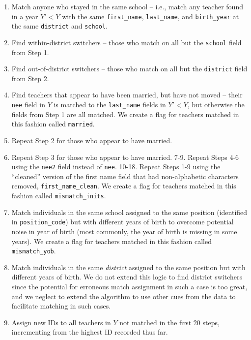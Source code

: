 \begin{appendices}
\begin{enumerate}
\def\labelenumi{\arabic{enumi}.}
\tightlist
\item
  Match anyone who stayed in the same school -- i.e., match any teacher
  found in a year \(Y'<Y\) with the same \texttt{first\_name},
  \texttt{last\_name}, and \texttt{birth\_year} at the same
  \texttt{district} and \texttt{school}.
\item
  Find within-district switchers -- those who match on all but the
  \texttt{school} field from Step 1.
\item
  Find out-of-district switchers -- those who match on all but the
  \texttt{district} field from Step 2.
\item
  Find teachers that appear to have been married, but have not moved --
  their \texttt{nee} field in \(Y\) is matched to the
  \texttt{last\_name} fields in \(Y'<Y\), but otherwise the fields from
  Step 1 are all matched. We create a flag for teachers matched in this
  fashion called \texttt{married}.
\item
  Repeat Step 2 for those who appear to have married.
\item
  Repeat Step 3 for those who appear to have married. 7-9. Repeat Steps
  4-6 using the \texttt{nee2} field instead of \texttt{nee}. 10-18.
  Repeat Steps 1-9 using the ``cleaned'' version of the first name field
  that had non-alphabetic characters removed,
  \texttt{first\_name\_clean}. We create a flag for teachers matched in
  this fashion called \texttt{mismatch\_inits}.
\item
  Match individuals in the same school assigned to the same position
  (identified in \texttt{position\_code}) but with different years of
  birth to overcome potential noise in year of birth (most commonly, the
  year of birth is missing in some years). We create a flag for teachers
  matched in this fashion called \texttt{mismatch\_yob}.
\item
  Match individuals in the same \emph{district} assigned to the same
  position but with different years of birth. We do not extend this
  logic to find district switchers since the potential for erroneous
  match assignment in such a case is too great, and we neglect to extend
  the algorithm to use other cues from the data to facilitate matching
  in such cases.
\item
  Assign new IDs to all teachers in \(Y\) not matched in the first 20
  steps, incrementing from the highest ID recorded thus far.
\end{enumerate}


\end{appendices}
